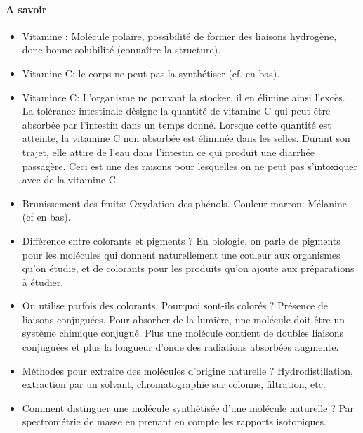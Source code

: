 \documentclass[11pt]{report}
\numberwithin{figure}{section}
\numberwithin{equation}{section}
\numberwithin{table}{section}
\newcommand{\1}{\boldsymbol{1}}
\begin{document}
\paragraph{A savoir}
\begin{itemize}
\item Vitamine : Molécule polaire, possibilité de former des liaisons hydrogène, donc bonne solubilité (connaître la structure). 
\item Vitamine C: le corps ne peut pas la synthétiser (cf. en bas).
\item Vitamince C: L'organisme ne pouvant la stocker, il en élimine ainsi l'excès. La tolérance intestinale désigne la quantité de vitamine C qui peut être absorbée par l'intestin dans un temps donné. Lorsque cette quantité est atteinte, la vitamine C non absorbée est éliminée dans les selles. Durant son trajet, elle attire de l'eau dans l'intestin ce qui produit une diarrhée passagère. Ceci est une des raisons pour lesquelles on ne peut pas s'intoxiquer avec de la vitamine C.
\item Brunissement des fruits: Oxydation des phénols. Couleur marron: Mélanine (cf en bas).
\item Différence entre colorants et pigments ? En biologie, on parle de pigments pour les molécules qui donnent naturellement une couleur aux organismes qu'on étudie, et de colorants pour les produits qu'on ajoute aux préparations à étudier.
\item On utilise parfois des colorants. Pourquoi sont-ils colorés ? Présence de
liaisons conjuguées. Pour absorber de la lumière, une molécule doit être un système chimique conjugué. Plus une molécule contient de doubles liaisons conjuguées et plus la longueur d’onde des radiations absorbées augmente.
\item Méthodes pour extraire des molécules d’origine naturelle ? Hydrodistillation, extraction par un solvant, chromatographie sur colonne, filtration, etc.
\item Comment distinguer une molécule synthétisée d’une molécule naturelle ? Par spectrométrie de masse en prenant en compte les rapports isotopiques.
\end{itemize}
\end{document}
